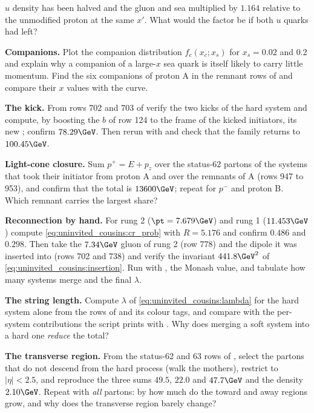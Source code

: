 \begin{exercises}
  $u$ density has been halved and the gluon and sea multiplied by $1.164$
  relative to the unmodified proton at the same $x'$. What would the
  factor be if both $u$ quarks had left?
\item \textbf{Companions.} Plot the companion distribution
  $f_c(x_c;x_s)$ for $x_s=0.02$ and $0.2$ and explain why a companion of a
  large-$x$ sea quark is itself likely to carry little momentum. Find the
  six companions of proton A in the remnant rows of  and
  compare their $x$ values with the curve.
\item \textbf{The kick.} From rows 702 and 703 of 
  verify the two kicks of the hard system and compute, by boosting the
  $b$ of row 124 to the frame of the kicked initiators, its new \pt;
  confirm $78.29\GeV$. Then rerun with  and check that the
  family \pt returns to $100.45\GeV$.
\item \textbf{Light-cone closure.} Sum $p^+=E+p_z$ over the status-62
  partons of the systems that took their initiator from proton A and over
  the remnants of A (rows 947 to 953), and confirm that the total is
  $13600\GeV$; repeat for $p^-$ and proton B. Which remnant carries the
  largest share?
\item \textbf{Reconnection by hand.} For rung 2 ($\pt=7.679\GeV$) and rung 1
  ($11.453\GeV$) compute \cref{eq:uninvited_cousins:cr_prob} with
  $R=5.176$ and confirm $0.486$ and $0.298$. Then take the $7.34\GeV$ gluon
  of rung 2 (row 778) and the dipole it was inserted into (rows 702 and
  738) and verify the invariant $441.8\GeV^2$ of
  \cref{eq:uninvited_cousins:insertion}. Run with ,
  the Monash value, and tabulate how many systems merge and the final
  $\lambda$.
\item \textbf{The string length.} Compute $\lambda$ of
  \cref{eq:uninvited_cousins:lambda} for the hard system alone from the
  rows of  and its colour tags, and compare with the
  per-system contributions the script prints with . Why does
  merging a soft system into a hard one \emph{reduce} the total?
\item \textbf{The transverse region.} From the status-62 and 63 rows of
  , select the partons that do not descend from the
  hard process (walk the mothers), restrict to $|\eta|<2.5$, and reproduce
  the three sums $49.5$, $22.0$ and $47.7\GeV$ and the density $2.10\GeV$.
  Repeat with \emph{all} partons: by how much do the toward and away
  regions grow, and why does the transverse region barely change?

\end{exercises}
